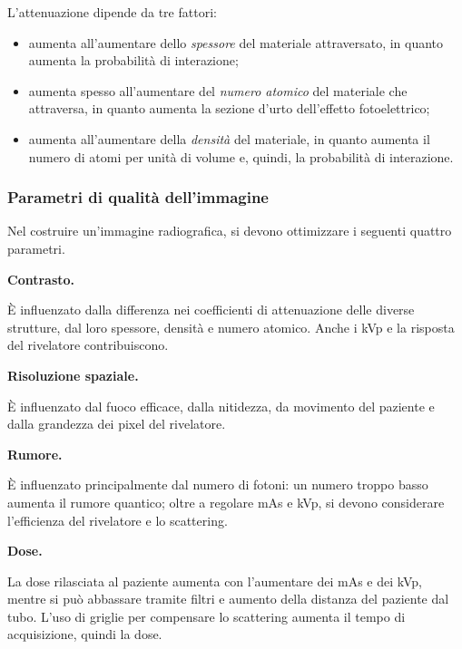 \documentclass[11pt, a4paper]{scrartcl}
\theoremstyle{style}
\theoremstyle{style1}
\numberwithin{equation}{subsection}
\begin{document}
\noindent L'attenuazione dipende da tre fattori:
\begin{itemize}
	\item aumenta all'aumentare dello \textit{spessore} del materiale attraversato, in quanto aumenta la probabilit\`a di interazione;
	\item aumenta spesso all'aumentare del \textit{numero atomico} del materiale che attraversa, in quanto aumenta la sezione d'urto dell'effetto fotoelettrico;
	\item aumenta all'aumentare della \textit{densit\`a} del materiale, in quanto aumenta il numero di atomi per unit\`a di volume e, quindi, la probabilit\`a di interazione.
\end{itemize}

\subsubsection{Parametri di qualit\`a dell'immagine}
Nel costruire un'immagine radiografica, si devono ottimizzare i seguenti quattro parametri.
\begin{center}
	\begin{minipage}[t]
		{.45\columnwidth}
		\textbf{Contrasto.} 

		\noindent \`E influenzato dalla differenza nei coefficienti di attenuazione delle diverse strutture, dal loro spessore, densit\`a e numero atomico.
		Anche i kVp e la risposta del rivelatore contribuiscono.
	\end{minipage}
	\hfill
	\begin{minipage}[t]
		{.45\columnwidth}
		\textbf{Risoluzione spaziale.} 

		\noindent \`E influenzato dal fuoco efficace, dalla nitidezza, da movimento del paziente e dalla grandezza dei pixel del rivelatore.
	\end{minipage}
\end{center}
\begin{center}
	\begin{minipage}[t]
		{.45\columnwidth}
		\textbf{Rumore.} 

		\noindent \`E influenzato principalmente dal numero di fotoni: un numero troppo basso aumenta il rumore quantico; oltre a regolare mAs e kVp, si devono considerare l'efficienza del rivelatore e lo scattering.
	\end{minipage}
	\hfill
	\begin{minipage}[t]
		{.45\columnwidth}
		\textbf{Dose.} 

		\noindent La dose rilasciata al paziente aumenta con l'aumentare dei mAs e dei kVp, mentre si pu\`o abbassare tramite filtri e aumento della distanza del paziente dal tubo. 
		L'uso di griglie per compensare lo scattering aumenta il tempo di acquisizione, quindi la dose.
	\end{minipage}
\end{center}
\end{document}
